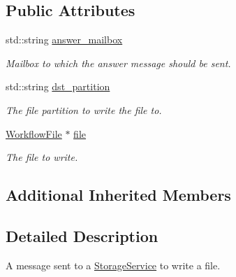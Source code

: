 \subsection*{Public Attributes}
\begin{DoxyCompactItemize}
\item 
\mbox{\label{classwrench_1_1_storage_service_file_write_request_message_aa09f6fbead99443ef62fa13a6f797412}} 
std\+::string \hyperlink{classwrench_1_1_storage_service_file_write_request_message_aa09f6fbead99443ef62fa13a6f797412}{answer\+\_\+mailbox}
\begin{DoxyCompactList}\small\item\em Mailbox to which the answer message should be sent. \end{DoxyCompactList}\item 
\mbox{\label{classwrench_1_1_storage_service_file_write_request_message_a773acda112ce5b0e9740a2471da7d470}} 
std\+::string \hyperlink{classwrench_1_1_storage_service_file_write_request_message_a773acda112ce5b0e9740a2471da7d470}{dst\+\_\+partition}
\begin{DoxyCompactList}\small\item\em The file partition to write the file to. \end{DoxyCompactList}\item 
\mbox{\label{classwrench_1_1_storage_service_file_write_request_message_a1e7b3431bbb6d82daeba75fd44eb84ed}} 
\hyperlink{classwrench_1_1_workflow_file}{Workflow\+File} $\ast$ \hyperlink{classwrench_1_1_storage_service_file_write_request_message_a1e7b3431bbb6d82daeba75fd44eb84ed}{file}
\begin{DoxyCompactList}\small\item\em The file to write. \end{DoxyCompactList}\end{DoxyCompactItemize}
\subsection*{Additional Inherited Members}


\subsection{Detailed Description}
A message sent to a \hyperlink{classwrench_1_1_storage_service}{Storage\+Service} to write a file. 

